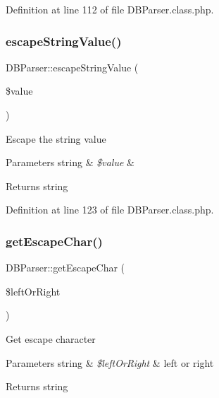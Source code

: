 Definition at line 112 of file D\+B\+Parser.\+class.\+php.

\mbox{\label{classDBParser_ac4a2f15f2cc6c4f0edf848cfc0005259}} 
\subsubsection{\texorpdfstring{escape\+String\+Value()}{escapeStringValue()}}
{\footnotesize\ttfamily D\+B\+Parser\+::escape\+String\+Value (\begin{DoxyParamCaption}\item[{}]{\$value }\end{DoxyParamCaption})}

Escape the string value


\begin{DoxyParams}[1]{Parameters}
string & {\em \$value} & \\
\hline
\end{DoxyParams}
\begin{DoxyReturn}{Returns}
string 
\end{DoxyReturn}


Definition at line 123 of file D\+B\+Parser.\+class.\+php.

\mbox{\label{classDBParser_aed9e06c08955d267a0576b178f37d6ee}} 
\subsubsection{\texorpdfstring{get\+Escape\+Char()}{getEscapeChar()}}
{\footnotesize\ttfamily D\+B\+Parser\+::get\+Escape\+Char (\begin{DoxyParamCaption}\item[{}]{\$left\+Or\+Right }\end{DoxyParamCaption})}

Get escape character


\begin{DoxyParams}[1]{Parameters}
string & {\em \$left\+Or\+Right} & left or right \\
\hline
\end{DoxyParams}
\begin{DoxyReturn}{Returns}
string 
\end{DoxyReturn}


